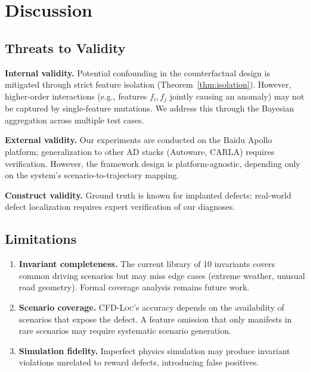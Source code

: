 \documentclass[journal]{IEEEtran}
\theoremstyle{plain}
\theoremstyle{definition}
\theoremstyle{remark}
\newcommand{\methodname}{\textsc{CFD-Loc}}
\begin{document}
\section{Discussion}
\label{sec:discussion}

\subsection{Threats to Validity}

\textbf{Internal validity.} Potential confounding in the counterfactual design is mitigated through strict feature isolation (Theorem~\ref{thm:isolation}). However, higher-order interactions (e.g., features $f_i, f_j$ jointly causing an anomaly) may not be captured by single-feature mutations. We address this through the Bayesian aggregation across multiple test cases.

\textbf{External validity.} Our experiments are conducted on the Baidu Apollo platform; generalization to other AD stacks (Autoware, CARLA) requires verification. However, the framework design is platform-agnostic, depending only on the system's scenario-to-trajectory mapping.

\textbf{Construct validity.} Ground truth is known for implanted defects; real-world defect localization requires expert verification of our diagnoses.

\subsection{Limitations}

\begin{enumerate}[nosep]
    \item \textbf{Invariant completeness.} The current library of 10 invariants covers common driving scenarios but may miss edge cases (extreme weather, unusual road geometry). Formal coverage analysis remains future work.
    \item \textbf{Scenario coverage.} \methodname's accuracy depends on the availability of scenarios that expose the defect. A feature omission that only manifests in rare scenarios may require systematic scenario generation.
    \item \textbf{Simulation fidelity.} Imperfect physics simulation may produce invariant violations unrelated to reward defects, introducing false positives.
\end{enumerate}
\end{document}
